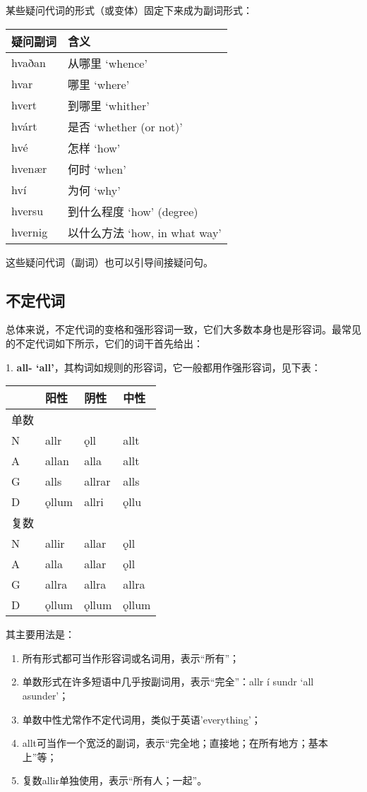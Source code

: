 某些疑问代词的形式（或变体）固定下来成为副词形式：

\begin{longtable}{ll}
\toprule
疑问副词 & 含义 \\
\midrule
\endhead
\bottomrule
\endfoot
hvaðan & 从哪里 `whence‌' \\
hvar & 哪里 `where‌' \\
hvert & 到哪里 `whither‌' \\
hvárt & 是否 `whether (or not)‌' \\
hvé & 怎样 `how‌' \\
hvenær & 何时 `when‌' \\
hví & 为何 `why‌' \\
hversu & 到什么程度 `how‌' (degree) \\
hvernig & 以什么方法 `how, in what way‌' \\
\end{longtable}

这些疑问代词（副词）也可以引导间接疑问句。

\subsection{不定代词}\label{ux4e0dux5b9aux4ee3ux8bcd}

总体来说，不定代词的变格和强形容词一致，它们大多数本身也是形容词。最常见的不定代词如下所示，它们的词干首先给出：

1. \textbf{all-
`all‌'}，其构词如规则的形容词，它一般都用作强形容词，见下表：

\begin{longtable}{llll}
\toprule
 & 阳性 & 阴性 & 中性 \\
\midrule
\endhead
\bottomrule
\endfoot
单数 & & & \\
N & allr & ǫll & allt \\
A & allan & alla & allt \\
G & alls & allrar & alls \\
D & ǫllum & allri & ǫllu \\
复数 & & & \\
N & allir & allar & ǫll \\
A & alla & allar & ǫll \\
G & allra & allra & allra \\
D & ǫllum & ǫllum & ǫllum \\
\end{longtable}

其主要用法是：

\begin{enumerate}
\def\labelenumi{\Alph{enumi}.}
\item
  所有形式都可当作形容词或名词用，表示``所有''；
\item
  单数形式在许多短语中几乎按副词用，表示``完全''：allr í sundr `all
  asunder'；
\item
  单数中性尤常作不定代词用，类似于英语'everything'；
\item
  allt可当作一个宽泛的副词，表示``完全地；直接地；在所有地方；基本上''等；
\item
  复数allir单独使用，表示``所有人；一起''。
\end{enumerate}

